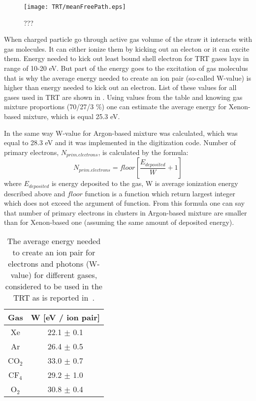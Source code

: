 \begin{figure}
\centering
 \texttt{[image: TRT/meanFreePath.eps]}
\caption{???}
\label{fig:meanFreePath}
\end{figure}

When charged particle go through active gas volume of the straw it interacts with gas molecules.
It can either ionize them by kicking out an electon or it can excite them. Energy needed to kick out least bound shell electron for TRT gases lays
in range of 10-20 eV. But part of the energy goes to the excitation of gas moleculus that is why the average energy needed to create an ion pair (so-called W-value) is higher than energy needed to 
kick out an electron. List of these values for all gases used in TRT are shown in .
Using values from the table and knowing gas mixture proportions (70/27/3 $\%$) one can estimate the average energy for Xenon-based mixture, which is equal 25.3 eV.

In the same way W-value for Argon-based mixture was calculated, which was equal to 28.3 eV and it was implemented in the digitization code.
Number of primary electrons, $N_{prim.electrons}$, is calculated by the formula:
\begin{equation}
 N_{prim.electrons} = floor \left[\dfrac{E_{deposited}}{W} + 1\right]
\end{equation}
where $E_{deposited}$ is energy deposited to the gas, W is average ionization energy described above and $floor$ function is a function which return
largest integer which does not exceed the argument of function.
From this formula one can say that number of primary electrons in clusters in Argon-based mixture are smaller than for Xenon-based one 
(assuming the same amount of deposited energy).

\begin{table}[p]
  \begin{tabular}{c|c}
    Gas & W [eV / ion pair]\\
    \hline
    Xe & 22.1 $\pm$ 0.1 \\
    Ar & 26.4 $\pm$ 0.5 \\
    CO$_2$ & 33.0 $\pm$ 0.7 \\
    CF$_4$ & 29.2 $\pm$ 1.0 \\
    O$_2$ & 30.8 $\pm$ 0.4 \\
  \end{tabular}
  \caption{The average energy needed to create an ion pair for electrons and photons (W-value) for different gases, 
  considered to be used in the TRT as is reported in~\cite{cwetanski_thesis}.}
  \label{tab:ionization_energy}
\end{table}

